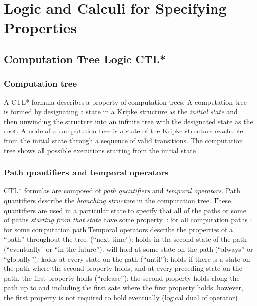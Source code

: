 \chapter{Logic and Calculi for Specifying Properties}

\section{Computation Tree Logic CTL*}

\subsection{Computation tree}
A CTL* formula describes a property of  computation trees. 
A computation tree is formed by designating a state in a Kripke 
structure as the {\em initial state} and then unwinding the 
structure into an infinite tree with the designated state as the root.
A node of a computation tree is a state of the Kripke structure
reachable from the initial state through a sequence of valid transitions.
The computation tree shows all possible executions starting from the
initial state

\subsection{Path quantifiers and temporal operators}
CTL* formulas are composed of {\em path quantifiers} and 
{\em temporal operators}. Path quantifiers describe the {\em branching
  structure} in the computation tree. 
These quantifiers are used in a particular state to specify that all of the
paths or some of paths {\em starting from that state\/} have some property.
    \bit
    \w {}: for all computation paths
    \w {}: for some computation path
    \eit
Temporal operators describe the properties of a ``path'' throughout
the tree. 
    \bit
    \w {} (``next time''): holds in the second state of the path
    \w {} (``eventually'' or ``in the future''): will hold at some state
    on the path 
    \w {} (``always'' or ``globally''): holds at every state on the path
    \w {} (``until''): holds if there is a state on the path where the
    second property holds, and at every preceding state on the path, the first
    property holds
    \w {} (``release''): the second property holds along the path up to
    and including the first sate where the first property holds; however, the
    first property is not required to hold eventually
    (logical dual of  operator)
    \eit
